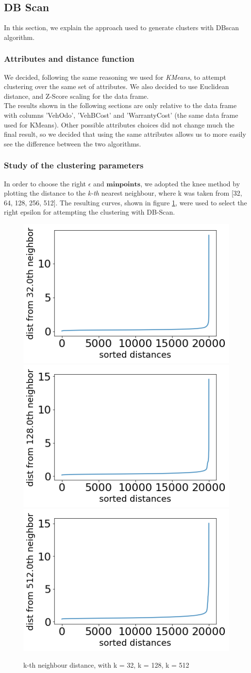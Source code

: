 \documentclass{article}
\begin{document}
	
	
	
	\subsection{DB Scan}
	In this section, we explain the approach used to generate clusters with DBscan algorithm.
	
	\subsubsection{Attributes and distance function}
	
	We decided, following the same reasoning we used for \emph{KMeans}, to attempt clustering over the same set of attributes. We also decided to use Euclidean distance, and Z-Score scaling for the data frame.\\
	The results shown in the following sections are only relative to the data frame with columns 'VehOdo', 'VehBCost' and 'WarrantyCost' (the same data frame used for KMeans). Other possible attributes choices did not change much the final result, so we decided that using the same attributes allows us to more easily see the difference between the two algorithms.
	
	\subsubsection{Study of the clustering parameters}
	In order to choose the right $\epsilon$ and $\mathbf{min points}$, we adopted the knee method by plotting the distance to the \emph{k-th} nearest neighbour, where k was taken from [32, 64, 128, 256, 512]. The resulting curves, shown in figure \ref{fig:kth}, were used to select the right epsilon for attempting the clustering with DB-Scan. 
	
	\begin{figure}[]
		\centering
		\includegraphics[width=.32\textwidth]{a32}\hfill
		\includegraphics[width=.32\textwidth]{a128}\hfill
		\includegraphics[width=.32\textwidth]{a512}
		\caption{k-th neighbour distance, with k = 32, k = 128, k = 512}
		\label{fig:kth}
	\end{figure}
	
\end{document}
